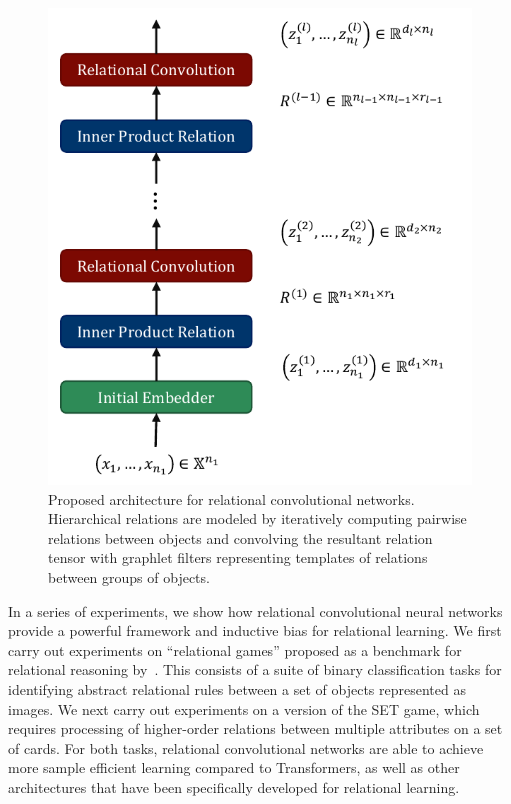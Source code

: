 \begin{figure}
    \vskip -20pt
    \centering
    \includegraphics[width=.5\textwidth]{figs/relconv_architecture.pdf}
    \vskip-5pt
    \caption{Proposed architecture for relational convolutional networks. Hierarchical relations are modeled by iteratively computing pairwise relations between objects and convolving the resultant relation tensor with graphlet filters representing templates of relations between groups of objects.
    }\label{fig:relconv_architecture}
\end{figure}

In a series of experiments, we show how relational convolutional neural networks provide a powerful framework and inductive bias for relational learning. We first carry out experiments on ``relational games'' proposed as a benchmark for relational reasoning by~\citep{shanahanExplicitlyRelationalNeural}. This consists of a suite of binary classification tasks for identifying abstract relational rules between a set of objects represented as images. We next carry out experiments on a version of the SET game, which requires processing of higher-order relations between multiple attributes on a set of cards. For both tasks, relational convolutional networks are able to achieve more sample efficient learning compared to Transformers, as well as other architectures that have been specifically developed for relational learning.

